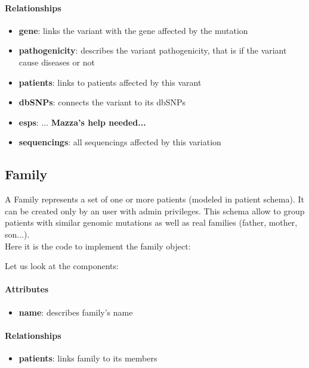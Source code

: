 \paragraph{Relationships}   
\begin{itemize}
	\item \textbf{gene}: links the variant with the gene affected by the mutation
	\item \textbf{pathogenicity}: describes the variant pathogenicity, that is if the variant cause diseases or not
  	\item \textbf{patients}: links to patients affected by this varant
  	\item \textbf{dbSNPs}: connects the variant to its dbSNPs
  	\item \textbf{esps}: ... \textbf{Mazza's help needed...}
  	\item \textbf{sequencings}: all sequencings affected by this variation
\end{itemize}


\subsection{Family}
A Family represents a set of one or more patients (modeled in patient schema). It can be created only by an user with admin privileges. This schema allow to group patients with similar genomic mutations as well as real families (father, mother, son{...}).
\\Here it is the code to implement the family object: 



Let us look at the components:

\paragraph{Attributes}      
\begin{itemize}
 	\item \textbf{name}: describes family's name
\end{itemize}

\paragraph{Relationships}   
\begin{itemize}
 	\item \textbf{patients}: links family to its members
\end{itemize}



